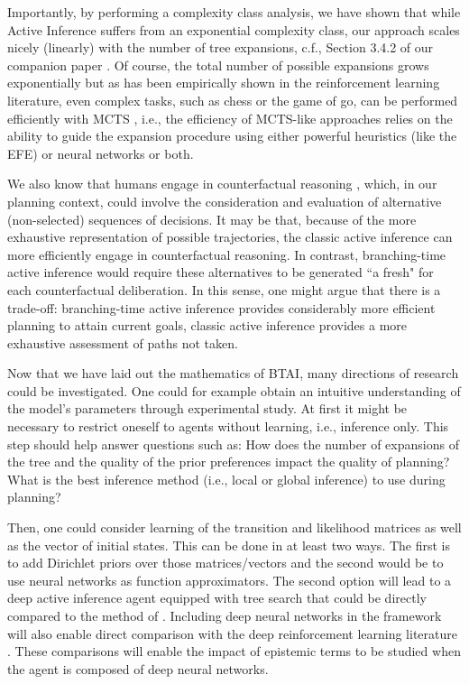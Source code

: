 \documentclass[twoside,11pt]{article}
\begin{document}
Importantly, by performing a complexity class analysis, we have shown that while Active Inference suffers from an exponential complexity class, our approach scales nicely (linearly) with the number of tree expansions, c.f., Section 3.4.2 of our companion paper \citep{AITS_PRACTICE}. Of course, the total number of possible expansions grows exponentially but as has been empirically shown in the reinforcement learning literature, even complex tasks, such as chess or the game of go, can be performed efficiently with MCTS \citep{Go,MuZero}, i.e., the efficiency of MCTS-like approaches relies on the ability to guide the expansion procedure using either powerful heuristics (like the EFE) or neural networks or both.

We also know that humans engage in counterfactual reasoning \citep{rafetseder2013counterfactual}, which, in our planning context, could involve the consideration and evaluation of alternative (non-selected) sequences of decisions. It may be that, because of the more exhaustive representation of possible trajectories, the classic active inference can more efficiently engage in counterfactual reasoning. In contrast, branching-time active inference would require these alternatives to be generated ``a fresh" for each counterfactual deliberation. In this sense, one might argue that there is a trade-off: branching-time active inference provides considerably more efficient planning to attain current goals, classic active inference provides a more exhaustive assessment of paths not taken.

Now that we have laid out the mathematics of BTAI, many directions of research could be investigated. One could for example obtain an intuitive understanding of the model's parameters through experimental study. At first it might be necessary to restrict oneself to agents without learning, i.e., inference only. This step should help answer questions such as: How does the number of expansions of the tree and the quality of the prior preferences impact the quality of planning? What is the best inference method (i.e., local or global inference) to use during planning?

Then, one could consider learning of the transition and likelihood matrices as well as the vector of initial states. This can be done in at least two ways. The first is to add Dirichlet priors over those matrices/vectors and the second would be to use neural networks as function approximators. The second option will lead to a deep active inference agent \citep{PixelBasedAI,DeepAI} equipped with tree search that could be directly compared to the method of \citet{DeepAIwithMCMC}. Including deep neural networks in the framework will also enable direct comparison with the deep reinforcement learning literature \citep{DBLP:journals/corr/abs-1801-01290,DeepRL,DDQN,lample2016playing,Go}. These comparisons will enable the impact of epistemic terms to be studied when the agent is composed of deep neural networks.
\end{document}
